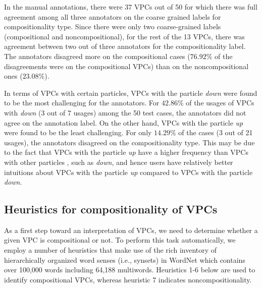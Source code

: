 \documentclass[output=paper
,modfonts
,nonflat]{langsci/langscibook}
\begin{document}
In the manual annotations, there were 37 VPCs out of 50 for which there was full agreement among all three annotators on the coarse grained labels for compositionality type. Since there were only two coarse-grained labels (compositional and noncompositional), for the rest of the 13 VPCs, there was agreement between two out of three annotators for the compositionality label. The annotators disagreed more on the compositional cases ($76.92\%$ of the disagreements were on the compositional VPCs) than on the noncompositional ones ($23.08\%$).

In terms of VPCs with certain particles, VPCs with the particle \textit{down} were found to be the most challenging for the annotators. For $42.86\%$ of the usages of VPCs with \textit{down} (3 out of 7 usages) among the 50 test cases, the annotators did not agree on the annotation label. On the other hand, VPCs with the particle \textit{up} were found to be the least challenging. For only $14.29\%$ of the cases (3 out of 21 usages), the annotators disagreed on the compositionality type. This may be due to the fact that VPCs with the particle \textit{up} have a higher frequency than VPCs with other particles \citep{Vil06}, such as \textit{down}, and hence users have relatively better intuitions about VPCs with the particle \textit{up} compared to VPCs with the particle \textit{down}.


\subsection{Heuristics for compositionality of VPCs} \label{sec:heuristics}

As a first step toward an interpretation of VPCs, we need to determine whether a given VPC is compositional or not. To perform this task automatically, we employ a number of heuristics that make use of the rich inventory of hierarchically organized word senses (i.e., synsets) in WordNet which contains over 100,000 words including 64,188 multiwords. Heuristics 1-6 below are used to identify compositional VPCs, whereas heuristic 7 indicates noncompositionality.
\end{document}
